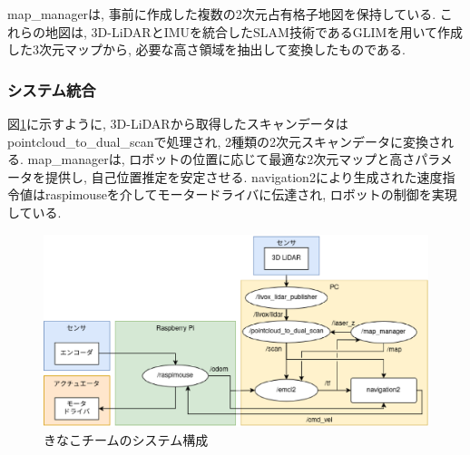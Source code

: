 map\_managerは, 事前に作成した複数の2次元占有格子地図を保持している. 
これらの地図は, 3D-LiDARとIMUを統合したSLAM技術であるGLIMを用いて作成した3次元マップから, 必要な高さ領域を抽出して変換したものである. 

\subsubsection{システム統合}
図\ref{fig:kinako_system}に示すように, 3D-LiDARから取得したスキャンデータはpointcloud\_to\_dual\_scanで処理され, 2種類の2次元スキャンデータに変換される. 
map\_managerは, ロボットの位置に応じて最適な2次元マップと高さパラメータを提供し, 自己位置推定を安定させる. 
navigation2により生成された速度指令値はraspimouseを介してモータードライバに伝達され, ロボットの制御を実現している. 

\begin{figure}[h]
  \begin{center}
    \includegraphics[width=1.0\linewidth]{figs/kinako_system.eps}
    \caption{きなこチームのシステム構成}
    \label{fig:kinako_system}
  \end{center}
\end{figure}
